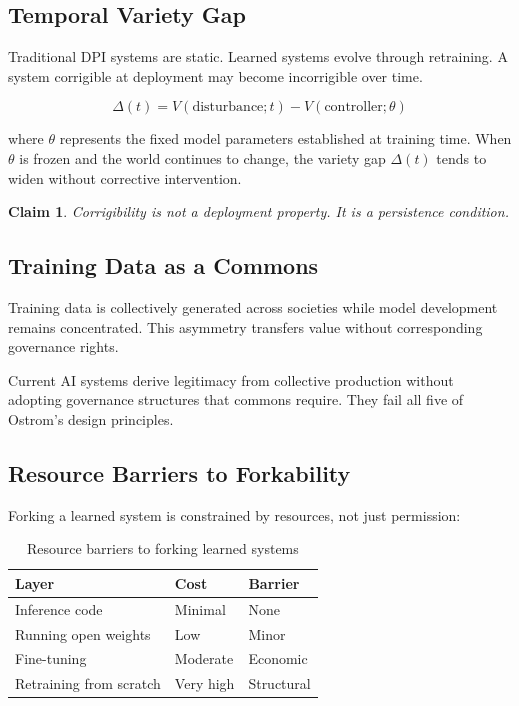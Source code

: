 \documentclass[11pt,a4paper]{article}
\newtheorem{claim}{Claim}
\begin{document}
\subsection{Temporal Variety Gap}

Traditional DPI systems are static. Learned systems evolve through retraining. A system corrigible at deployment may become incorrigible over time.

\begin{equation}
\Delta(t) = V(\text{disturbance}; t) - V(\text{controller}; \theta)
\end{equation}

where $\theta$ represents the fixed model parameters established at training time. When $\theta$ is frozen and the world continues to change, the variety gap $\Delta(t)$ tends to widen without corrective intervention.

\begin{claim}
Corrigibility is not a deployment property. It is a persistence condition.
\end{claim}

\subsection{Training Data as a Commons}

Training data is collectively generated across societies while model development remains concentrated. This asymmetry transfers value without corresponding governance rights.

Current AI systems derive legitimacy from collective production without adopting governance structures that commons require. They fail all five of Ostrom's design principles.

\subsection{Resource Barriers to Forkability}

Forking a learned system is constrained by resources, not just permission:

\begin{table}[htbp]
\centering
\begin{tabular}{@{}lll@{}}
\toprule
\textbf{Layer} & \textbf{Cost} & \textbf{Barrier} \\
\midrule
Inference code & Minimal & None \\
Running open weights & Low & Minor \\
Fine-tuning & Moderate & Economic \\
Retraining from scratch & Very high & Structural \\
\bottomrule
\end{tabular}
\caption{Resource barriers to forking learned systems}
\end{table}
\end{document}
